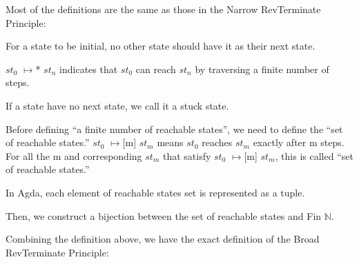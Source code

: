 Most of the definitions are the same as those in the Narrow RevTerminate Principle:

For a state to be initial, no other state should have it as their next state.



$st_{0}$ $\mapsto$* $st_{n}$ indicates that $st_{0}$ can reach $st_{n}$ by traversing a finite number of steps.



If a state have no next state, we call it a stuck state.



Before defining ``a finite number of reachable states'', we need to define the ``set of reachable states.''
$st_{0}$ $\mapsto$[m] $st_{m}$ means $st_{0}$ reaches $st_{m}$ exactly after m steps.
For all the m and corresponding $st_{m}$ that satisfy $st_{0}$ $\mapsto$[m] $st_{m}$, this is called ``set of reachable states.''



In Agda, each element of reachable states set is represented as a tuple. 



Then, we construct a bijection between the set of reachable states and Fin $\mathbb{N}$.



Combining the definition above, we have the exact definition of the Broad RevTerminate Principle:


